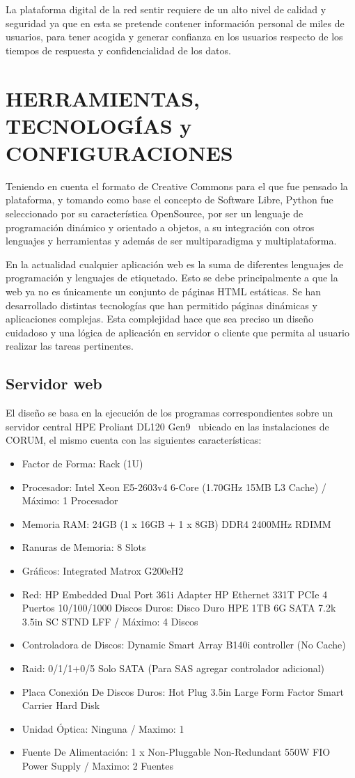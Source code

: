 \documentclass[a4paper]{article}
\begin{document}
La plataforma digital de la red sentir requiere de un alto nivel de calidad y seguridad ya que en esta se pretende contener información personal de miles de usuarios, para tener acogida y generar confianza en los usuarios respecto de los tiempos de respuesta y confidencialidad de los datos.

\section{HERRAMIENTAS, TECNOLOGÍAS y CONFIGURACIONES}\label{sec:herramientas}
Teniendo en cuenta el formato de Creative Commons para el que fue pensado la plataforma, y tomando como base el concepto de Software Libre, Python fue seleccionado por su característica OpenSource, por ser un lenguaje de programación dinámico y orientado a objetos, a su integración con otros lenguajes y herramientas y además de ser multiparadigma y multiplataforma.

En la actualidad cualquier aplicación web es la suma de diferentes lenguajes de programación y lenguajes de etiquetado. Esto se debe principalmente a que la web ya no es únicamente un conjunto de páginas HTML estáticas. Se han desarrollado distintas tecnologías que han permitido páginas dinámicas y aplicaciones complejas. Esta complejidad hace que sea preciso un diseño cuidadoso y una lógica de aplicación en servidor o cliente que permita al usuario realizar las tareas pertinentes.

\subsection{Servidor web}
El diseño se basa en la ejecución de los programas correspondientes sobre un servidor central HPE Proliant DL120 Gen9~\citep{Manual2018} ubicado en las instalaciones de CORUM, el mismo cuenta con las siguientes características: 
\begin{itemize}
	\item Factor de Forma: Rack (1U)
	\item Procesador: Intel Xeon E5-2603v4 6-Core (1.70GHz 15MB L3 Cache) / Máximo: 1 Procesador
	\item Memoria RAM: 24GB (1 x 16GB + 1 x 8GB) DDR4 2400MHz RDIMM
	\item Ranuras de Memoria: 8 Slots
	\item Gráficos: Integrated Matrox G200eH2
	\item Red: HP Embedded Dual Port 361i Adapter HP Ethernet 331T PCIe 4 Puertos 10/100/1000 Discos Duros: Disco Duro HPE 1TB 6G SATA 7.2k 3.5in SC STND LFF / Máximo: 4 Discos
	\item Controladora de Discos: Dynamic Smart Array B140i controller (No Cache)
	\item Raid: 0/1/1+0/5 Solo SATA (Para SAS agregar controlador adicional)
	\item Placa Conexión De Discos Duros: Hot Plug 3.5in Large Form Factor Smart Carrier Hard Disk
	\item Unidad Óptica: Ninguna / Maximo: 1
	\item Fuente De Alimentación: 1 x Non-Pluggable Non-Redundant 550W FIO Power Supply / Maximo: 2 Fuentes	
\end{itemize}
\end{document}
